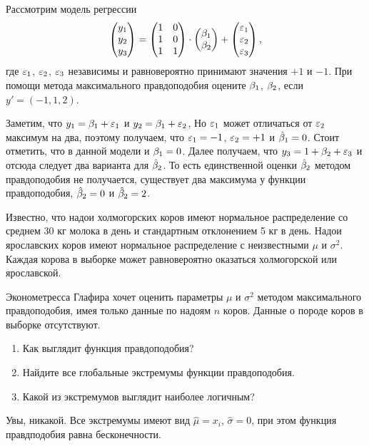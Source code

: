 \begin{problem}
Рассмотрим модель регрессии
\begin{equation*}
\begin{pmatrix}
y_1 \\
y_2 \\
y_3
\end{pmatrix}
=
\begin{pmatrix}
1 & 0 \\
1 & 0 \\
1 & 1
\end{pmatrix} \cdot
\begin{pmatrix}
\beta_1 \\
\beta_2
\end{pmatrix} +
\begin{pmatrix}
\varepsilon_1 \\
\varepsilon_2 \\
\varepsilon_3
\end{pmatrix},
\end{equation*}
где $\varepsilon_1$, $\varepsilon_2$, $\varepsilon_3$ независимы и равновероятно принимают значения $+1$ и $-1$. При помощи метода максимального правдоподобия оцените $\beta_1$, $\beta_2$, если $y'=(-1,1,2)$.


\begin{sol}
Заметим, что $y_1=\beta_1+\varepsilon_1$ и $y_2=\beta_1 + \varepsilon_2$, Но $\varepsilon_1$ может отличаться от $\varepsilon_2$ максимум на два, поэтому получаем, что $\varepsilon_1=-1$, $\varepsilon_2=+1$ и $\hat{\beta}_1=0$. Стоит отметить, что в данной модели и $\beta_1=0$.
Далее получаем, что $y_3=1+\beta_2 + \varepsilon_3$ и отсюда следует два варианта для $\hat{\beta}_2$. То есть единственной оценки $\hat{\beta}_2$ методом правдоподобия не получается, существует два максимума у функции правдоподобия, $\hat{\beta}_2=0$ и $\hat{\beta}_2=2$.
\end{sol}
\end{problem}



\begin{problem}
Известно, что надои холмогорских коров имеют нормальное распределение со среднем 30 кг молока в день и стандартным отклонением 5 кг в день. Надои ярославских коров имеют нормальное распределение с неизвестными $\mu$ и $\sigma^2$.
Каждая корова в выборке может равновероятно оказаться холмогорской или ярославской.

Эконометресса Глафира хочет оценить параметры $\mu$ и $\sigma^2$ методом максимального правдоподобия, имея только данные по надоям $n$ коров. Данные о породе коров в выборке отсутствуют.

\begin{enumerate}
\item Как выглядит функция правдоподобия?
\item Найдите все глобальные экстремумы функции правдоподобия.
\item Какой из экстремумов выглядит наиболее логичным?
\end{enumerate}


\begin{sol}
Увы, никакой. Все экстремумы имеют вид $\hat{\mu}=x_i$, $\hat{\sigma}=0$, при этом функция правдподобия равна бесконечности.
\end{sol}
\end{problem}

